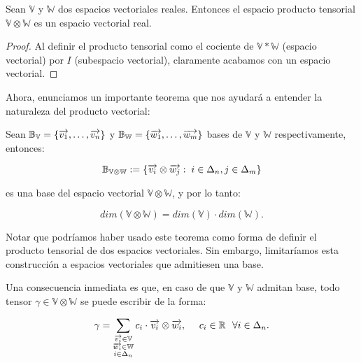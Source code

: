 \begin{proposicion}
	Sean $\mathbb{V}$ y $\mathbb{W}$ dos espacios vectoriales reales. Entonces el espacio producto tensorial $\mathbb{V} \otimes \mathbb{W}$ es un espacio vectorial real.
\end{proposicion}

\begin{proof}
	Al definir el producto tensorial como el cociente de $\mathbb{V} \ast \mathbb{W}$ (espacio vectorial) por $I$ (subespacio vectorial), claramente acabamos con un espacio vectorial.
\end{proof}


Ahora, enunciamos un importante teorema que nos ayudará a entender la naturaleza del producto vectorial:

\begin{teorema} \label{th:base_prod_tensorial}
	Sean $\mathbb{B}_{\mathbb{V}} = \{\overrightarrow{v_1}, \ldots, \overrightarrow{v_n}\}$ y  $\mathbb{B}_{\mathbb{W}} = \{\overrightarrow{w_1}, \ldots, \overrightarrow{w_m}\}$ bases de $\mathbb{V}$ y  $\mathbb{W}$ respectivamente, entonces:

	\begin{equation}
		\mathbb{B}_{\mathbb{V} \otimes \mathbb{W}} := \{ \overrightarrow{v_i} \otimes \overrightarrow{w_j}: \; i \in \Delta_{n}, j \in \Delta_{m} \}
	\end{equation}


	es una base del espacio vectorial $\mathbb{V} \otimes \mathbb{W}$, y por lo tanto:

	\begin{equation}
		dim(\mathbb{V} \otimes \mathbb{W}) = dim(\mathbb{V}) \cdot dim(\mathbb{W}).
	\end{equation}

\end{teorema}

\begin{observacion}
	Notar que podríamos haber usado este teorema como forma de definir el producto tensorial de dos espacios vectoriales. Sin embargo, limitaríamos esta construcción a espacios vectoriales que admitiesen una base.
\end{observacion}

Una consecuencia inmediata es que, en caso de que $\mathbb{V}$ y $\mathbb{W}$ admitan base, todo tensor $\gamma \in \mathbb{V} \otimes \mathbb{W}$ se puede escribir de la forma:

\begin{equation}
	\gamma = \sum_{\substack{\overrightarrow{v_i} \in \mathbb{V}\\ \overrightarrow{w_i} \in \mathbb{W}\\ i \in \Delta_{n}}} c_{i} \cdot \overrightarrow{v_i} \otimes \overrightarrow{w_i}, \ \ \ \  c_i \in \mathbb{R} \ \  \forall i \in \Delta_{n}.
\end{equation}

